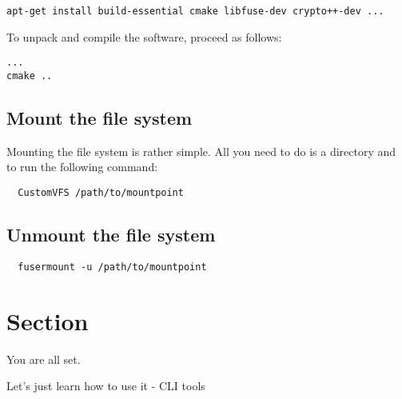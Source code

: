 


\begin{Verbatim}
apt-get install build-essential cmake libfuse-dev crypto++-dev ...
\end{Verbatim}

To unpack and compile the software, proceed as follows:

\begin{Verbatim}
...
cmake ..
\end{Verbatim}

\subsection*{Mount the file system}

Mounting the file system is rather simple.
All you need to do is a directory and to run the following command:

\begin{Verbatim}
  CustomVFS /path/to/mountpoint
\end{Verbatim}


\subsection*{Unmount the file system}

\begin{Verbatim}
  fusermount -u /path/to/mountpoint
\end{Verbatim}

\section*{Section}

You are all set.

Let's just learn how to use it - CLI tools